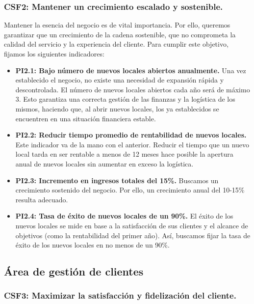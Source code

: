 \documentclass[12pt]{opticajnl}
\begin{document}
\subsubsection*{CSF2: Mantener un crecimiento escalado y sostenible.}

Mantener la esencia del negocio es de vital importancia. Por ello, queremos garantizar que un crecimiento de la cadena sostenible, que no comprometa la calidad del servicio y la experiencia del cliente. Para cumplir este objetivo, fijamos los siguientes indicadores:

\begin{itemize}
    \item \textbf{PI2.1: Bajo número de nuevos locales abiertos anualmente.} Una vez establecido el negocio, no existe una necesidad de expansión rápida y descontrolada. El número de nuevos locales abiertos cada año será de máximo 3. Esto garantiza una correcta gestión de las finanzas y la logística de los mismos, haciendo que, al abrir nuevos locales, los ya establecidos se encuentren en una situación financiera estable.
    \item \textbf{PI2.2: Reducir tiempo promedio de rentabilidad de nuevos locales.} Este indicador va de la mano con el anterior. Reducir el tiempo que un nuevo local tarda en ser rentable a menos de 12 meses hace posible la apertura anual de nuevos locales sin aumentar en exceso la logística.
    \item \textbf{PI2.3: Incremento en ingresos totales del 15\%.} Buscamos un crecimiento sostenido del negocio. Por ello, un crecimiento anual del 10-15\% resulta adecuado.
    \item \textbf{PI2.4: Tasa de éxito de nuevos locales de un 90\%.} El éxito de los nuevos locales se mide en base a la satisfacción de sus clientes y el alcance de objetivos (como la rentabilidad del primer año). Así, buscamos fijar la tasa de éxito de los nuevos locales en no menos de un 90\%.  
\end{itemize}






\subsection{Área de gestión de clientes}

\subsubsection*{CSF3: Maximizar la satisfacción y fidelización del cliente.}
\end{document}
